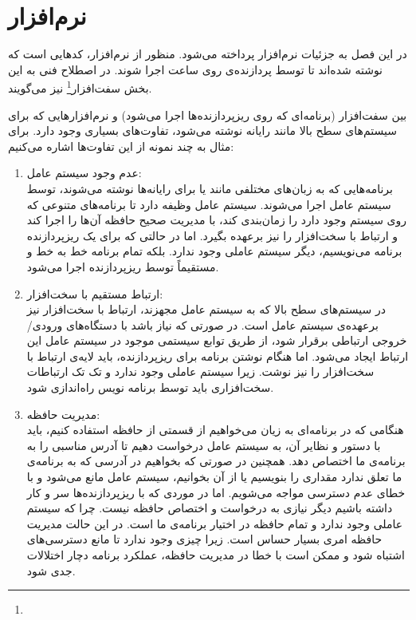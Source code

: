 \chapter{نرم‌افزار}

در این فصل به جزئیات نرم‌افزار پرداخته می‌شود. منظور از نرم‌افزار، کدهایی است که نوشته شده‌اند تا توسط پردازنده‌ی روی ساعت اجرا شوند. در اصطلاح فنی به این بخش سفت‌افزار\footnote{} نیز می‌گویند.

بین سفت‌افزار (برنامه‌ای که روی ریزپردازنده‌ها اجرا می‌شود) و نرم‌افزارهایی که برای سیستم‌های سطح بالا مانند رایانه نوشته می‌شود، تفاوت‌های بسیاری وجود دارد. برای مثال به چند نمونه از این تفاوت‌ها اشاره می‌کنیم:

\begin{enumerate}
	\item عدم وجود سیستم عامل: \\
	برنامه‌هایی که به زبان‌های مختلفی مانند  یا  برای رایانه‌ها نوشته می‌شوند، توسط سیستم عامل اجرا می‌شوند. سیستم عامل وظیفه دارد تا برنامه‌های متنوعی که روی سیستم وجود دارد را زمان‌بندی کند، با مدیریت صحیح حافظه آن‌ها را اجرا کند و ارتباط با سخت‌افزار را نیز برعهده بگیرد. اما در حالتی که برای یک ریزپردازنده برنامه می‌نویسیم، دیگر سیستم عاملی وجود ندارد. بلکه تمام برنامه خط به خط و مستقیماً توسط ریزپردازنده اجرا می‌شود.
	
	\item ارتباط مستقیم با سخت‌افزار: \\
	در سیستم‌های سطح بالا که به سیستم عامل مجهزند، ارتباط با سخت‌افزار نیز برعهده‌ی سیستم عامل است. در صورتی که نیاز باشد با دستگاه‌های ورودی/خروجی ارتباطی برقرار شود، از طریق توابع سیستمی موجود در سیستم عامل این ارتباط ایجاد می‌شود. اما هنگام نوشتن برنامه برای ریزپردازنده، باید لایه‌ی ارتباط با سخت‌افزار را نیز نوشت. زیرا سیستم عاملی وجود ندارد و تک تک ارتباطات سخت‌افزاری باید توسط برنامه نویس راه‌اندازی شود.
	
	\item مدیریت حافظه: \\
	هنگامی که در برنامه‌ای به زیان  می‌خواهیم از قسمتی از حافظه استفاده کنیم، باید با دستور  و نظایر آن، به سیستم عامل درخواست دهیم تا آدرس مناسبی را به برنامه‌ی ما اختصاص دهد. همچنین در صورتی که بخواهیم در آدرسی که به برنامه‌ی ما تعلق ندارد مقداری را بنویسیم یا از آن بخوانیم، سیستم عامل مانع می‌شود و با خطای عدم دسترسی مواجه می‌شویم. اما در موردی که با ریزپردازنده‌ها سر و کار داشته باشیم دیگر نیازی به درخواست و اختصاص حافظه نیست. چرا که سیستم عاملی وجود ندارد و تمام حافظه در اختیار برنامه‌ی ما است. در این حالت مدیریت حافظه امری بسیار حساس است. زیرا چیزی وجود ندارد تا مانع دسترسی‌های اشتباه شود و ممکن است با خطا در مدیریت حافظه، عملکرد برنامه دچار اختلالات جدی شود.
	

\end{enumerate}
